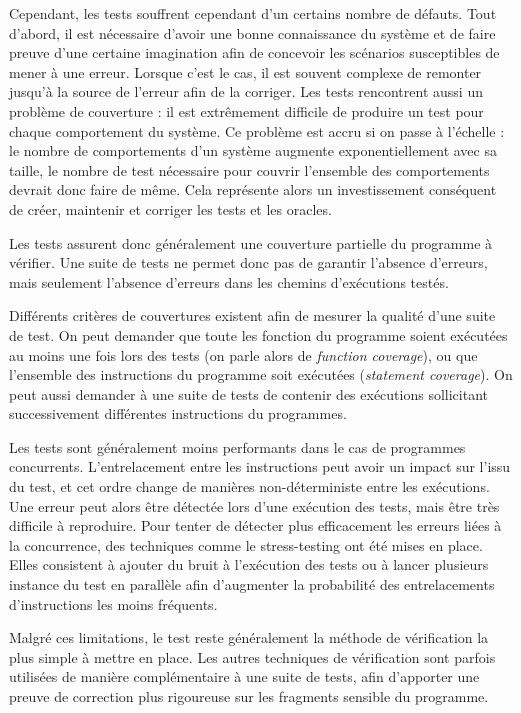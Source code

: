 Cependant, les tests souffrent cependant d'un certains nombre de
défauts. Tout d'abord, il est nécessaire d'avoir une bonne connaissance
du système et de faire preuve d'une certaine imagination afin de
concevoir les scénarios susceptibles de mener à une erreur. Lorsque
c'est le cas, il est souvent complexe de remonter jusqu'à la source de
l'erreur afin de la corriger. Les tests rencontrent aussi un problème de
couverture : il est extrêmement difficile de produire un test pour
chaque comportement du système. Ce problème est accru si on passe à
l'échelle : le nombre de comportements d'un système augmente
exponentiellement avec sa taille, le nombre de test nécessaire pour
couvrir l'ensemble des comportements devrait donc faire de même. Cela
représente alors un investissement conséquent de créer, maintenir et
corriger les tests et les oracles.

Les tests assurent donc généralement une couverture partielle du
programme à vérifier. Une suite de tests ne permet donc pas de garantir
l'absence d'erreurs, mais seulement l'absence d'erreurs dans les chemins
d'exécutions testés.

Différents critères de couvertures existent afin de mesurer la qualité
d'une suite de test. On peut demander que toute les fonction du
programme soient exécutées au moins une fois lors des tests (on parle
alors de \emph{function coverage}), ou que l'ensemble des instructions
du programme soit exécutées (\emph{statement coverage}). On peut aussi
demander à une suite de tests de contenir des exécutions sollicitant
successivement différentes instructions du programmes.

Les tests sont généralement moins performants dans le cas de programmes
concurrents. L'entrelacement entre les instructions peut avoir un impact
sur l'issu du test, et cet ordre change de manières non-déterministe
entre les exécutions. Une erreur peut alors être détectée lors d'une
exécution des tests, mais être très difficile à reproduire. Pour tenter
de détecter plus efficacement les erreurs liées à la concurrence, des
techniques comme le stress-testing ont été mises en place. Elles
consistent à ajouter du bruit à l'exécution des tests ou à lancer
plusieurs instance du test en parallèle afin d'augmenter la probabilité
des entrelacements d'instructions les moins fréquents.

Malgré ces limitations, le test reste généralement la méthode de
vérification la plus simple à mettre en place. Les autres techniques de
vérification sont parfois utilisées de manière complémentaire à une
suite de tests, afin d'apporter une preuve de correction plus rigoureuse
sur les fragments sensible du programme.

